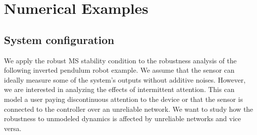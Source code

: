 













\section{Numerical Examples}
\subsection{System configuration}
We apply the robust MS stability condition to the robustness analysis of the following inverted pendulum robot example. We assume that the sensor can ideally measure some of the system's outputs without additive noises. However, we are interested in analyzing the effects of intermittent attention. This can model a user paying discontinuous attention to the device or that the sensor is connected to the controller over an unreliable network. We want to study how the robustness to unmodeled dynamics is affected by unreliable networks and vice versa.  

